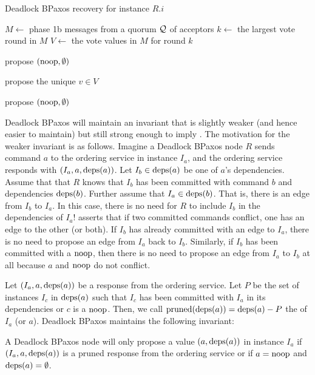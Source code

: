 \begin{algorithm}
  \caption{Deadlock BPaxos recovery for instance $R.i$}%
  \begin{algorithmic}
    \State{} $M \gets$ phase 1b messages from a quorum $\mathcal{Q}$ of acceptors
    \State{} $k \gets$ the largest vote round in $M$
    \State{} $V \gets$ the vote values in $M$ for round $k$

      \State propose $(\text{noop}, \emptyset)$
    \EndIf

      \State propose the unique $v \in V$
    \EndIf

      \State propose $(\text{noop}, \emptyset)$
    \EndIf

  \end{algorithmic}
\end{algorithm}


Deadlock BPaxos will maintain an invariant that is slightly weaker (and hence
easier to maintain) but still strong enough to imply
. The motivation for the weaker invariant is as
follows. Imagine a Deadlock BPaxos node $R$ sends command $a$ to the ordering
service in instance $I_a$, and the ordering service responds with $(I_a, a,
\text{deps}(a))$. Let $I_b \in \text{deps}(a)$ be one of $a$'s dependencies. Assume that
that $R$ knows that $I_b$ has been committed with command $b$ and dependencies
$\text{deps}(b)$. Further assume that $I_a \in \text{deps}(b)$. That is, there is an edge
from $I_b$ to $I_a$. In this case, there is no need for $R$ to include $I_b$ in
the dependencies of $I_a$!  asserts that if two
committed commands conflict, one has an edge to the other (or both). If $I_b$
has already committed with an edge to $I_a$, there is no need to propose an
edge from $I_a$ back to $I_b$.
%
Similarly, if $I_b$ has been committed with a $\text{noop}$, then there is no need to
propose an edge from $I_a$ to $I_b$ at all because $a$ and $\text{noop}$ do not
conflict.

\newcommand{\pruned}{\text{pruned}}
Let $(I_a, a, \text{deps}(a))$ be a response from the ordering service. Let $P$ be
the set of instances $I_c$ in $\text{deps}(a)$ such that $I_c$ has been committed
with $I_a$ in its dependencies or $c$ is a $\text{noop}$. Then, we call
$\pruned(\deps{a}) = \deps{a} - P$ the  of $I_a$
(or $a$). Deadlock BPaxos maintains the following invariant:

\begin{boxedinvariant}
  A Deadlock BPaxos node will only propose a value $(a, \text{deps}(a))$ in instance
  $I_a$ if $(I_a, a, \text{deps}(a))$ is a pruned response from the ordering service
  or if $a = \text{noop}$ and $\text{deps}(a) = \emptyset$.
\end{boxedinvariant}

